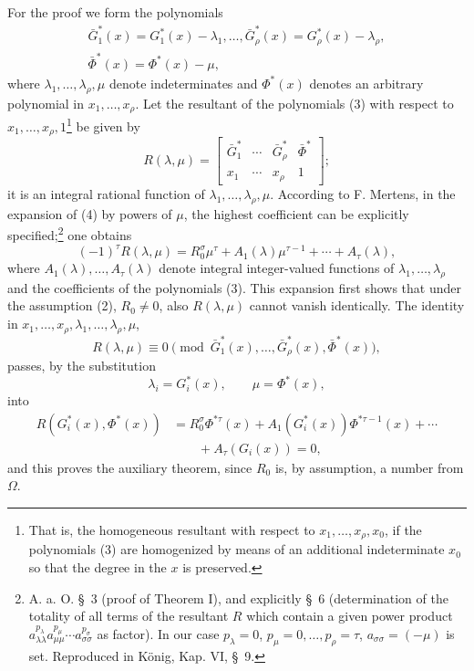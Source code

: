 \documentclass[11pt]{article}
\begin{document}
For the proof we form the polynomials
\begin{equation}
\begin{gathered}
  \bar G_1^*(x)=G_1^*(x)-\lambda_1,
  \ldots,
  \bar G_\rho^*(x)=G_\rho^*(x)-\lambda_\rho,\\
  \bar\Phi^*(x)=\Phi^*(x)-\mu,
\end{gathered}
\tag{3}
\end{equation}
where $\lambda_1,
\ldots,\lambda_\rho,\mu$ denote indeterminates and $\Phi^*(x)$ denotes an arbitrary polynomial in $x_1,
\ldots,x_\rho$. Let the resultant of the polynomials (3) with respect to $x_1,
\ldots,x_\rho,1$\footnote{That is, the homogeneous resultant with respect to $x_1,
\ldots,x_\rho,x_0$, if the polynomials (3) are homogenized by means of an additional indeterminate $x_0$ so that the degree in the $x$ is preserved.} be given by
\begin{equation}
  R(\lambda,\mu)=\left[
  \begin{array}{cccc}
   \bar G_1^*&\cdots&\bar G_\rho^*&\bar\Phi^*\\
   x_1&\cdots&x_\rho&1
  \end{array}
  \right];
\tag{4}
\end{equation}
it is an integral rational function of $\lambda_1,
\ldots,\lambda_\rho,
\mu$. According to F. Mertens, in the expansion of (4) by powers of $\mu$, the highest coefficient can be explicitly specified;\footnote{A. a. O. \S\ 3 (proof of Theorem I), and explicitly \S\ 6 (determination of the totality of all terms of the resultant $R$ which contain a given power product $a_{\lambda\lambda}^{p_\lambda}a_{\mu\mu}^{p_\mu}\cdots a_{\sigma\sigma}^{p_\sigma}$ as factor). In our case $p_\lambda=0$, $p_\mu=0,\ldots,p_\rho=\tau$, $a_{\sigma\sigma}=(-\mu)$ is set. Reproduced in König, Kap. VI, \S\ 9.} one obtains
\begin{equation}
  (-1)^\tau R(\lambda,\mu)
  =R_0^\sigma\mu^\tau+A_1(\lambda)\mu^{\tau-1}+\cdots+A_\tau(\lambda),
\tag{5}
\end{equation}
where $A_1(\lambda),\ldots,A_\tau(\lambda)$ denote integral integer-valued functions of $\lambda_1,
\ldots,\lambda_\rho$ and the coefficients of the polynomials (3). This expansion first shows that under the assumption (2), $R_0\ne0$, also $R(\lambda,
\mu)$ cannot vanish identically. The identity in $x_1,
\ldots,x_\rho,
\lambda_1,
\ldots,
\lambda_\rho,
\mu$,
\[
  R(\lambda,
\mu)\equiv 0\pmod{\bar G_1^*(x),\ldots,
\bar G_\rho^*(x),\bar\Phi^*(x)},
\]
passes, by the substitution
\[
  \lambda_i=G_i^*(x),\qquad \mu=\Phi^*(x),
\]
into
\begin{equation}
\begin{aligned}
  R(G_i^*(x),\Phi^*(x))
  &=R_0^\sigma\Phi^{*\tau}(x)
    +A_1(G_i^*(x))\Phi^{*\tau-1}(x)+\cdots \\
  &\qquad +A_\tau(G_i(x))=0,
\end{aligned}
\tag{6}
\end{equation}
and this proves the auxiliary theorem, since $R_0$ is, by assumption, a number from $\Omega$.
\end{document}
